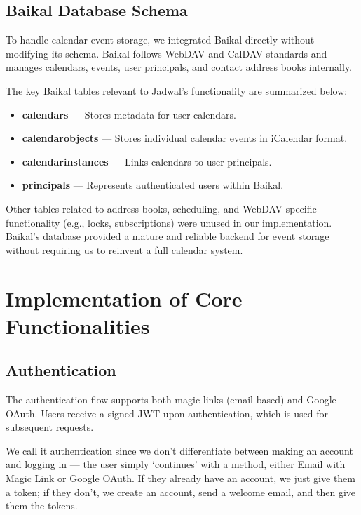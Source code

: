 \subsection{Baikal Database Schema}

To handle calendar event storage, we integrated Baikal directly without modifying its schema. Baikal follows WebDAV and CalDAV standards and manages calendars, events, user principals, and contact address books internally.

The key Baikal tables relevant to Jadwal's functionality are summarized below:

\begin{itemize}
    \item \textbf{calendars} — Stores metadata for user calendars.
    \item \textbf{calendarobjects} — Stores individual calendar events in iCalendar format.
    \item \textbf{calendarinstances} — Links calendars to user principals.
    \item \textbf{principals} — Represents authenticated users within Baikal.
\end{itemize}

Other tables related to address books, scheduling, and WebDAV-specific functionality (e.g., locks, subscriptions) were unused in our implementation. Baikal's database provided a mature and reliable backend for event storage without requiring us to reinvent a full calendar system.


\section{Implementation of Core Functionalities}

\subsection{Authentication} \label{subsec:authentication}

The authentication flow supports both magic links (email-based) and Google OAuth. Users receive a signed JWT upon authentication, which is used for subsequent requests.

We call it authentication since we don't differentiate between making an account and logging in — the user simply `continues' with a method, either Email with Magic Link or Google OAuth. If they already have an account, we just give them a token; if they don't, we create an account, send a welcome email, and then give them the tokens.

